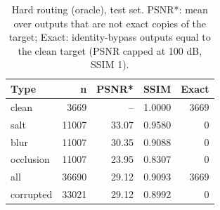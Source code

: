 \begin{table}[t]
\centering
\caption{Hard routing (oracle), test set. PSNR*: mean over outputs that are not exact copies of the target; Exact: identity-bypass outputs equal to the clean target (PSNR capped at 100 dB, SSIM 1).}
\label{tab:t2_routing_oracle_by_type}
\begin{tabular}{lrrrr}
\toprule
Type & n & PSNR* & SSIM & Exact \\
\midrule
clean & 3669 & -- & 1.0000 & 3669 \\
salt & 11007 & 33.07 & 0.9580 & 0 \\
blur & 11007 & 30.35 & 0.9088 & 0 \\
occlusion & 11007 & 23.95 & 0.8307 & 0 \\
all & 36690 & 29.12 & 0.9093 & 3669 \\
corrupted & 33021 & 29.12 & 0.8992 & 0 \\
\bottomrule
\end{tabular}
\end{table}

